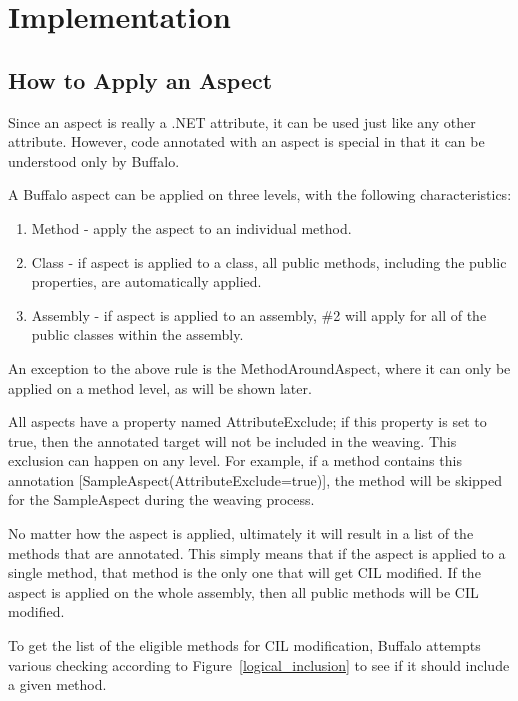 \chapter{Implementation}

\section{How to Apply an Aspect}

Since an aspect is really a .NET attribute, it can be used just like any other attribute. However, code annotated with an aspect is special in that it can be understood only by Buffalo.

A Buffalo aspect can be applied on three levels, with the following characteristics:

\begin{enumerate}
  \item Method - apply the aspect to an individual method.
  \item Class - if aspect is applied to a class, all public methods, including the public properties, are automatically applied.
  \item Assembly - if aspect is applied to an assembly, \#2 will apply for all of the public classes within the assembly.
\end{enumerate}

An exception to the above rule is the MethodAroundAspect, where it can only be applied on a method level, as will be shown later.

All aspects have a property named AttributeExclude; if this property is set to true, then the annotated target will not be included in the weaving. This exclusion can happen on any level. For example, if a method contains this annotation [SampleAspect(AttributeExclude=true)], the method will be skipped for the SampleAspect during the weaving process.

No matter how the aspect is applied, ultimately it will result in a list of the methods that are annotated. This simply means that if the aspect is applied to a single method, that method is the only one that will get CIL modified. If the aspect is applied on the whole assembly, then all public methods will be CIL modified.

To get the list of the eligible methods for CIL modification, Buffalo attempts various checking according to Figure~\ref{logical_inclusion} to see if it should include a given method.

